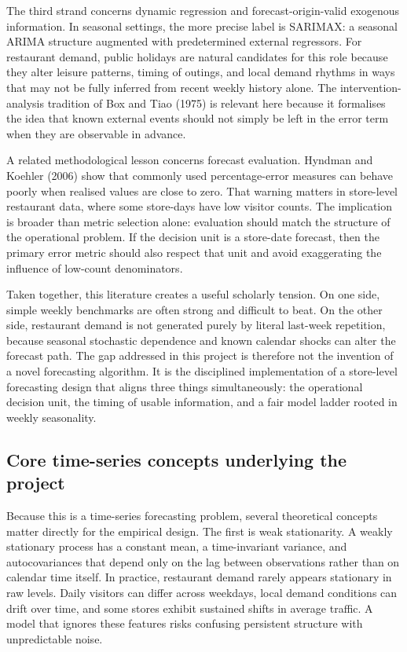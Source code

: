 \documentclass[11pt,oneside]{scrartcl}
\begin{document}
The third strand concerns dynamic regression and forecast-origin-valid exogenous information. In seasonal settings, the more precise label is SARIMAX: a seasonal ARIMA structure augmented with predetermined external regressors. For restaurant demand, public holidays are natural candidates for this role because they alter leisure patterns, timing of outings, and local demand rhythms in ways that may not be fully inferred from recent weekly history alone. The intervention-analysis tradition of Box and Tiao (1975) is relevant here because it formalises the idea that known external events should not simply be left in the error term when they are observable in advance.

A related methodological lesson concerns forecast evaluation. Hyndman and Koehler (2006) show that commonly used percentage-error measures can behave poorly when realised values are close to zero. That warning matters in store-level restaurant data, where some store-days have low visitor counts. The implication is broader than metric selection alone: evaluation should match the structure of the operational problem. If the decision unit is a store-date forecast, then the primary error metric should also respect that unit and avoid exaggerating the influence of low-count denominators.

Taken together, this literature creates a useful scholarly tension. On one side, simple weekly benchmarks are often strong and difficult to beat. On the other side, restaurant demand is not generated purely by literal last-week repetition, because seasonal stochastic dependence and known calendar shocks can alter the forecast path. The gap addressed in this project is therefore not the invention of a novel forecasting algorithm. It is the disciplined implementation of a store-level forecasting design that aligns three things simultaneously: the operational decision unit, the timing of usable information, and a fair model ladder rooted in weekly seasonality.

\subsection{Core time-series concepts underlying the project}
Because this is a time-series forecasting problem, several theoretical concepts matter directly for the empirical design. The first is weak stationarity. A weakly stationary process has a constant mean, a time-invariant variance, and autocovariances that depend only on the lag between observations rather than on calendar time itself. In practice, restaurant demand rarely appears stationary in raw levels. Daily visitors can differ across weekdays, local demand conditions can drift over time, and some stores exhibit sustained shifts in average traffic. A model that ignores these features risks confusing persistent structure with unpredictable noise.
\end{document}

